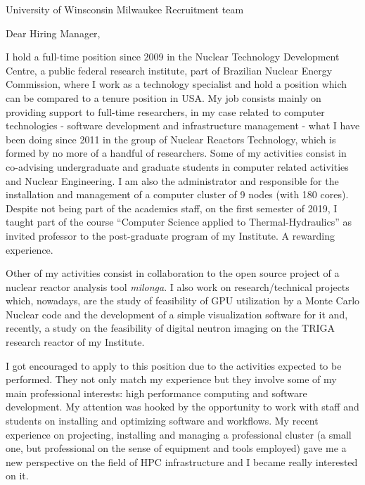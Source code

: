 \documentclass[11pt]{letter}
\begin{document}
\begin{letter}{University of Winsconsin Milwaukee Recruitment team}

  \opening{Dear Hiring Manager,}
  
  I hold a full-time position since 2009 in the Nuclear Technology Development Centre, a public federal
  research institute, part of Brazilian Nuclear Energy Commission, where I work as a technology
  specialist and hold a position which can be compared to a tenure position in USA. My job consists mainly on
  providing support to full-time researchers, in my case
  related to computer technologies - software development and infrastructure management - what I have been
  doing since 2011 in the group of Nuclear Reactors Technology, which is formed by no more of a handful of researchers.
  Some of my activities consist in co-advising undergraduate and graduate students in computer related
  activities and Nuclear Engineering. I am also the administrator and responsible for the installation and management of a
  computer cluster of 9 nodes (with 180 cores). Despite not being part of the academics staff, on the first semester of 2019,
  I taught part of the course ``Computer Science applied to Thermal-Hydraulics'' as invited professor to the post-graduate 
  program of my Institute. A rewarding experience.

  Other of my activities consist in collaboration
  to the open source project of a nuclear reactor
  analysis tool \textit{milonga}. I also work on research/technical projects which, nowadays, are the study of
  feasibility of GPU utilization by a Monte Carlo Nuclear code and the development of
  a simple visualization software for it and, recently, a study on the feasibility of digital neutron imaging on
  the TRIGA research reactor of my Institute.
    
  I got encouraged to apply to this position due to the activities expected to be performed. They not only
  match my experience but they involve some of my main professional interests: high performance computing and
  software development. My attention was hooked by the opportunity to work with staff and students on installing
  and optimizing software and workflows. %
  My recent experience on projecting, installing and managing a professional
  cluster (a small one, but professional on the sense of equipment and tools employed) gave me a new perspective
  on the field of HPC infrastructure and I became really interested on it.
  

\end{letter}
\end{document}
